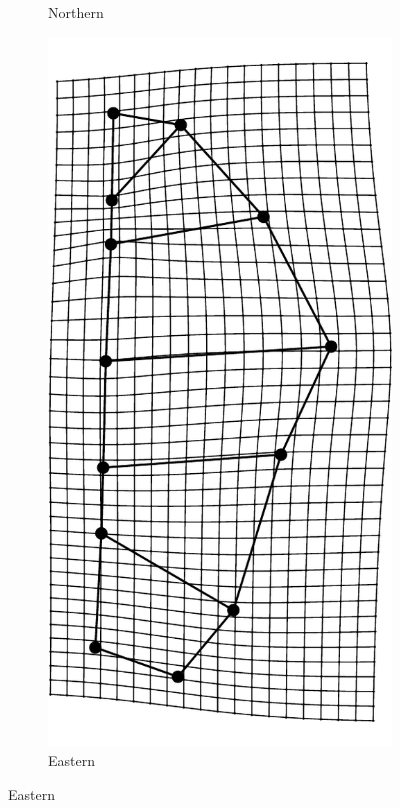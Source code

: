 \documentclass[12pt,letterpaper]{article}\usepackage{graphicx, color}
\begin{document}
\begin{figure}[ht]
\begin{subfigure}[b]{0.4\textwidth}
    \caption{Northern}
    \label{fig:mean_shape1}
  \end{subfigure}
  \begin{subfigure}[b]{0.4\textwidth}
    \centering
    \includegraphics[width = \textwidth, height = 0.35\textheight, keepaspectratio = true]{figure/mshape_2}
    \caption{Eastern}
    \label{fig:mean_shape2}
  \end{subfigure}


\end{figure}
\end{document}

